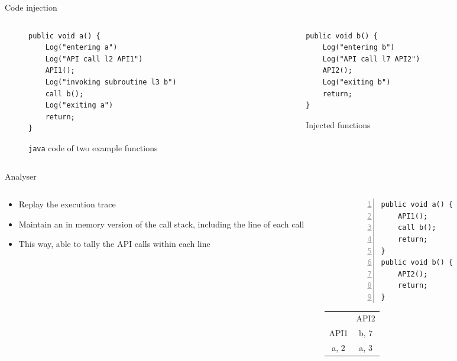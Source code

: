 \begin{frame}[fragile]{Code injection}
\begin{columns}
\begin{column}{0.5\textwidth}
\begin{figure}%
\centering
\begin{lstlisting}
public void a() {
	Log("entering a")
	Log("API call l2 API1")
	API1();
	Log("invoking subroutine l3 b")
	call b();
	Log("exiting a")
	return;
}
\end{lstlisting}
\caption{\texttt{java} code of two example functions}
\end{figure}
\end{column}
%
\begin{column}{0.5\textwidth}
\begin{figure}
\centering
\begin{lstlisting}
public void b() {
	Log("entering b")
	Log("API call l7 API2")
	API2();
	Log("exiting b")
	return;
}
\end{lstlisting}
\caption{Injected functions}
\end{figure}
\end{column}
\end{columns}
\end{frame} 
%
%
\begin{frame}[fragile]{Analyser} %
\begin{columns}
%
\begin{column}{0.5\textwidth}
\begin{itemize}
\item Replay the execution trace
\item Maintain an in memory version of the call stack, including the line of each call
\item This way, able to tally the API calls within each line
\end{itemize}
\end{column}
%
\begin{column}{0.4\textwidth}
\begin{figure}%
\centering
\begin{lstlisting}[numbers=left]
public void a() {
	API1();
	call b();
	return;
}
public void b() {
	API2();
	return;
}
\end{lstlisting}
\label{fig:exfunctions}
\end{figure}
\begin{tabular}{c | c}
   & API2 \\
   API1 &  b, 7\\
  a, 2 & a, 3 
\end{tabular}
\end{column}
\end{columns}
\note{
}
\end{frame}  

